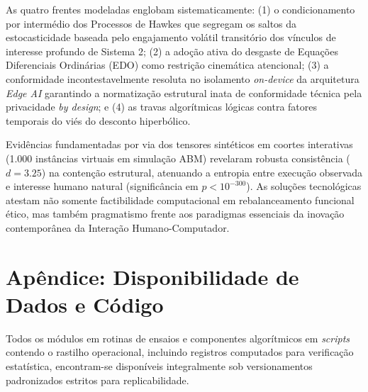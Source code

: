 As quatro frentes modeladas englobam sistematicamente: (1) o condicionamento por intermédio dos Processos de Hawkes que segregam os saltos da estocasticidade baseada pelo engajamento volátil transitório dos vínculos de interesse profundo de Sistema 2; (2) a adoção ativa do desgaste de Equações Diferenciais Ordinárias (EDO) como restrição cinemática atencional; (3) a conformidade incontestavelmente resoluta no isolamento \textit{on-device} da arquitetura \textit{Edge AI} garantindo a normatização estrutural inata de conformidade técnica pela privacidade \textit{by design}; e (4) as travas algorítmicas lógicas contra fatores temporais do viés do desconto hiperbólico.

Evidências fundamentadas por via dos tensores sintéticos em coortes interativas (1.000 instâncias virtuais em simulação ABM) revelaram robusta consistência ($d = 3.25$) na contenção estrutural, atenuando a entropia entre execução observada e interesse humano natural (significância em $p < 10^{-300}$). As soluções tecnológicas atestam não somente factibilidade computacional em rebalanceamento funcional ético, mas também pragmatismo frente aos paradigmas essenciais da inovação contemporânea da Interação Humano-Computador.




\section*{Apêndice: Disponibilidade de Dados e Código}
Todos os módulos em rotinas de ensaios e componentes algorítmicos em \textit{scripts} contendo o rastilho operacional, incluindo registros computados para verificação estatística, encontram-se disponíveis integralmente sob versionamentos padronizados estritos para replicabilidade.


